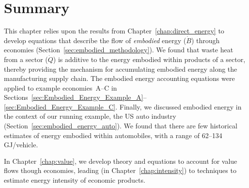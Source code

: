 \section{Summary}
\label{sec:embodied_energy_summary}

This chapter relies upon the results from Chapter~\ref{chap:direct_energy} to 
develop equations that describe the flow of 
\emph{embodied} energy ($\dot{B}$) through economies 
(Section~\ref{sec:embodied_methodology}).
We found that waste heat from a sector ($\dot{Q}$)
is additive to the energy embodied within products of a sector, 
thereby providing the mechanism for accumulating embodied energy 
along the manufacturing supply chain.
The embodied energy accounting equations were applied to example
economies~A--C %
in Sections~\ref{sec:Embodied_Energy_Example_A}--\ref{sec:Embodied_Energy_Example_C}. 
Finally, we discussed embodied energy in the context 
of our running example, the US auto industry (Section~\ref{sec:embodied_energy_auto}).
We found that there are few historical estimates of energy embodied within
automobiles, with a range of 62--134 GJ/vehicle.

In Chapter~\ref{chap:value}, we develop theory and equations to account
for value flows though economies, leading (in Chapter~\ref{chap:intensity})
to techniques to estimate energy intensity of economic products.







%
%

